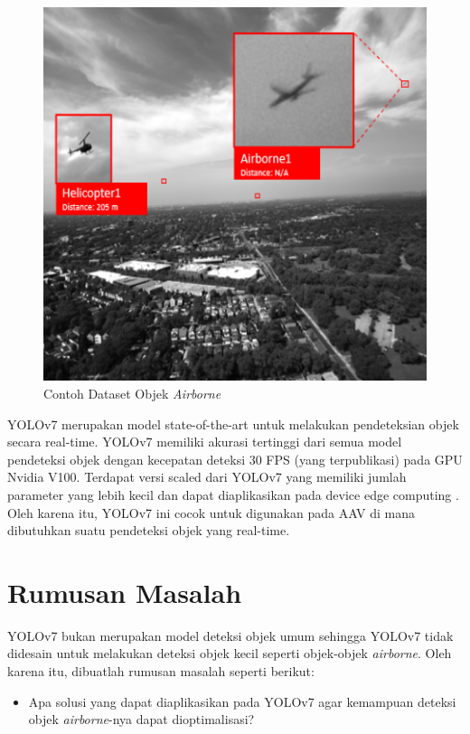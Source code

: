     \begin{figure} [ht]
        \centering
        \includegraphics[scale=0.5]{figures/dataset-example-labeled.png}
        \caption{Contoh Dataset Objek \emph{Airborne}}
        \label{fig:airborne-object-example-1}
    \end{figure}

    YOLOv7 merupakan model state-of-the-art untuk melakukan pendeteksian objek secara real-time.
    YOLOv7 memiliki akurasi tertinggi dari semua model pendeteksi objek dengan kecepatan deteksi 30 FPS (yang terpublikasi) pada GPU Nvidia V100.
    Terdapat versi scaled dari YOLOv7 yang memiliki jumlah parameter yang lebih kecil dan dapat diaplikasikan pada device edge computing \parencite{yolov7}.
    Oleh karena itu, YOLOv7 ini cocok untuk digunakan pada AAV di mana dibutuhkan suatu pendeteksi objek yang real-time.

\section{Rumusan Masalah}
    YOLOv7 bukan merupakan model deteksi objek umum sehingga YOLOv7 tidak didesain untuk melakukan deteksi objek kecil seperti objek-objek \emph{airborne}.
    Oleh karena itu, dibuatlah rumusan masalah seperti berikut:
    \begin{itemize}
        \item Apa solusi yang dapat diaplikasikan pada YOLOv7 agar kemampuan deteksi objek \emph{airborne}-nya dapat dioptimalisasi?
    \end{itemize}

